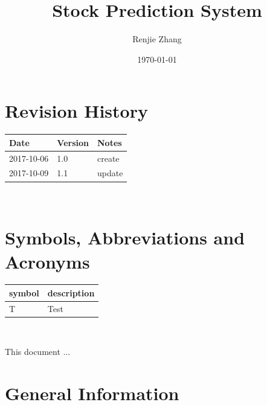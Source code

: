 \documentclass[12pt, titlepage]{article}
\begin{document}
\title{Stock Prediction System} 
\author{Renjie Zhang}
\date{\today}
\maketitle


\section{Revision History}

\begin{tabularx}{\textwidth}{p{3cm}p{2cm}X}
\toprule {\bf Date} & {\bf Version} & {\bf Notes}\\
\midrule
2017-10-06 & 1.0 & create\\
2017-10-09 & 1.1 & update\\
\bottomrule
\end{tabularx}

~\newpage

\section{Symbols, Abbreviations and Acronyms}

\renewcommand{\arraystretch}{1.2}
\begin{tabular}{l l} 
\toprule 
\textbf{symbol} & \textbf{description}\\
\midrule 
T & Test\\
\bottomrule
\end{tabular}\\


\newpage

\tableofcontents

\listoftables

\listoffigures

\newpage


This document ...

\section{General Information}
\end{document}
